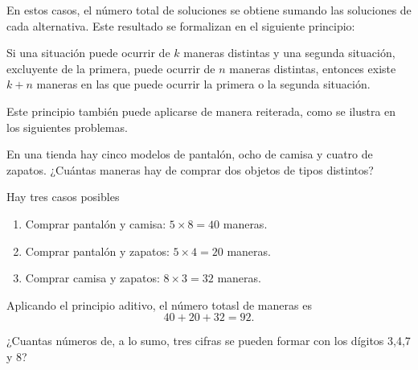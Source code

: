 \documentclass[12pt,a4paper]{book}
\begin{document}
    En estos casos, el número total de soluciones se obtiene sumando las soluciones de cada alternativa. Este resultado se formalizan en el siguiente principio:

    \begin{mdframed}[style=mdpinkbox,frametitle={Principio Aditivo}]
        Si una situación puede ocurrir de $k$ maneras distintas y una segunda situación, excluyente de la primera, puede ocurrir de $n$ maneras distintas, entonces existe $k+n$ maneras en las que puede ocurrir la primera o la segunda situación.
    \end{mdframed}

    Este principio también puede aplicarse de manera reiterada, como se ilustra en los siguientes problemas.

    \begin{mdframed}[style=mdgraybox,frametitle={Problema 8: Compra de dos objetos distintos}]
        En una tienda hay cinco modelos de pantalón, ocho de camisa y cuatro de zapatos. ¿Cuántas maneras hay de comprar dos objetos de tipos distintos?
    \end{mdframed}

    \begin{solucion}
        Hay tres casos posibles
        \begin{enumerate}
            \item Comprar pantalón y camisa: $5\times8=40$ maneras.
            \item Comprar pantalón y zapatos: $5\times4=20$ maneras.
            \item Comprar camisa y zapatos: $8\times3=32$ maneras.
        \end{enumerate}
        Aplicando el principio aditivo, el número totasl de maneras es
        \begin{equation*}
            40+20+32=92.
        \end{equation*}
    \end{solucion}

    \begin{mdframed}[style=mdgraybox,frametitle={Problema 9: Números de hasta tres cifras}]
        ¿Cuantas números de, a lo sumo, tres cifras se pueden formar con los dígitos 3,4,7 y 8?
    \end{mdframed}
\end{document}
